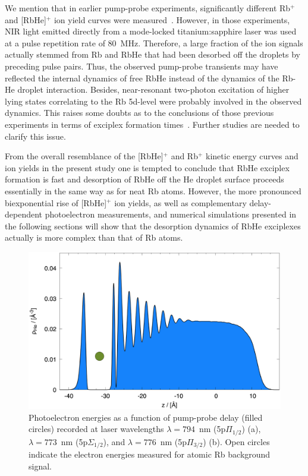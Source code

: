 
We mention that in earlier pump-probe experiments, significantly different Rb$^+$ and [RbHe]$^+$ ion yield curves were measured~\cite{Droppelmann:2004}. However, in those experiments, NIR light emitted directly from a mode-locked titanium:sapphire laser was used at a pulse repetition rate of 80~MHz. Therefore, a large fraction of the ion signals actually stemmed from Rb and RbHe that had been desorbed off the droplets by preceding pulse pairs. Thus, the observed pump-probe transients may have reflected the internal dynamics of free RbHe instead of the dynamics of the Rb-He droplet interaction. Besides, near-resonant two-photon excitation of higher lying states correlating to the Rb 5d-level were probably involved in the observed dynamics. This raises some doubts as to the conclusions of those previous experiments in terms of exciplex formation times~\cite{Droppelmann:2004,Vangerow:2017}. Further studies are needed to clarify this issue.

From the overall resemblance of the [RbHe]$^+$ and Rb$^+$ kinetic energy curves and ion yields in the present study one is tempted to conclude that RbHe exciplex formation is fast and desorption of RbHe off the He droplet surface proceeds essentially in the same way as for neat Rb atoms. However, the more pronounced biexponential rise of [RbHe]$^+$ ion yields, as well as complementary delay-dependent photoelectron measurements, and numerical simulations presented in the following sections will show that the desorption dynamics of RbHe exciplexes actually is more complex than that of Rb atoms.

\begin{figure}[ht]
	\centering
	\includegraphics[width=1.0\linewidth]{fig4}
	\caption{Photoelectron energies as a function of pump-probe delay (filled circles) recorded at laser wavelengths $\lambda=794$~nm (5p$\Pi_{1/2}$) (a), $\lambda=773$~nm (5p$\Sigma_{1/2}$), and $\lambda=776$~nm (5p$\Pi_{3/2}$) (b). Open circles indicate the electron energies measured for atomic Rb background signal.}
	\label{fig:eK}
\end{figure}
